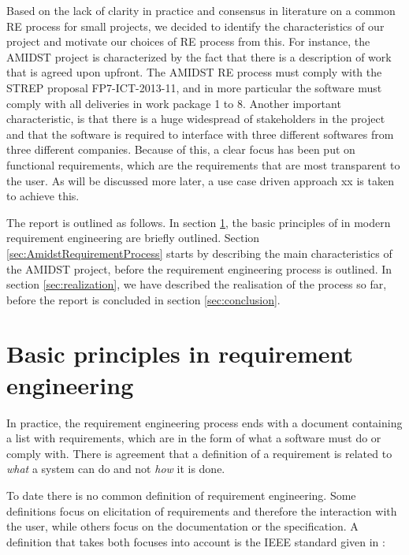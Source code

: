 \documentclass[11pt, oneside]{article}   	%
\begin{document}
Based on the lack of clarity in practice and consensus in literature on a common RE process for small projects, we decided to identify the characteristics of our project and motivate our choices of RE process from this.  For instance, the AMIDST project is characterized by the fact that there is a description of work that is agreed upon upfront.  The 
AMIDST RE process must comply with the STREP proposal FP7-ICT-2013-11, and in more particular the software must comply with all deliveries in work package 1 to 8. 
Another important characteristic, is that there is a huge widespread of stakeholders in the project and that the software is required to interface with three different softwares from three different companies.  Because of this, a clear focus has been put on functional requirements, which are the requirements that are most transparent to the user.  As will be discussed more later, a use case driven approach xx is taken to achieve this.

The report is outlined as follows.  In section \ref{sec:stateOfArt}, the basic principles of in modern requirement engineering are briefly outlined.  Section \ref{sec:AmidstRequirementProcess} starts by describing the main characteristics of the AMIDST project, before the requirement engineering process is outlined.  In section \ref{sec:realization}, we have described the realisation of the process so far, before the report is concluded in section \ref{sec:conclusion}.


\section{Basic principles in requirement engineering}
\label{sec:stateOfArt}

In practice, the requirement engineering process ends with a document containing a list with requirements, which are in the form of what a software must do or comply with.  There is agreement that a definition of a requirement is related to \emph{what} a system can do and not \emph{how} it is done.  

To date there is no common definition of requirement engineering.  Some definitions focus on elicitation of requirements and therefore the interaction with the user, while others focus on the documentation or the specification.  A definition that takes both focuses into account is the IEEE standard given in \cite{Iee90}:
\end{document}
